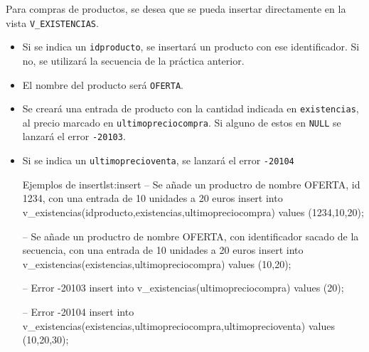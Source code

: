 \begin{homeworkProblem}
  Para compras de productos, se desea que se pueda insertar directamente en la vista \texttt{V\_EXISTENCIAS}.
  \begin{itemize}
  \item Si se indica un \texttt{idproducto}, se insertará un producto con ese identificador. Si no, se utilizará la secuencia de la práctica anterior.
  \item El nombre del producto será \texttt{OFERTA}.
  \item Se creará una entrada de producto con la cantidad indicada en \texttt{existencias}, al precio marcado en \texttt{ultimopreciocompra}. Si alguno de estos en \texttt{NULL} se lanzará el error \texttt{-20103}.
  \item Si se indica un \texttt{ultimoprecioventa}, se lanzará el error \texttt{-20104}

    \begin{listadosql}{Ejemplos de insert}{lst:insert}
    -- Se añade un productro de nombre OFERTA, id 1234, con una entrada de 10 unidades a 20 euros
    insert into v_existencias(idproducto,existencias,ultimopreciocompra) 
                values (1234,10,20);

    -- Se añade un productro de nombre OFERTA, con identificador sacado de la secuencia, con una entrada de 10 unidades a 20 euros
    insert into v_existencias(existencias,ultimopreciocompra) 
                values (10,20);

    -- Error -20103
    insert into v_existencias(ultimopreciocompra) values (20);

    -- Error -20104
    insert into v_existencias(existencias,ultimopreciocompra,ultimoprecioventa) 
                values (10,20,30);


    \end{listadosql}
  \end{itemize}

\end{homeworkProblem}


